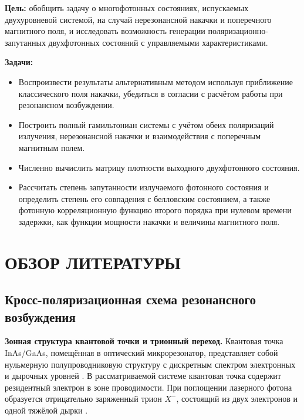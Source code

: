 \documentclass[11pt]{article}    %
\numberwithin{equation}{section}
\begin{document}
{\bf Цель:} обобщить задачу о многофотонных состояниях, испускаемых двухуровневой
системой, на случай нерезонансной накачки и поперечного магнитного поля,
и исследовать возможность генерации поляризационно-запутанных двухфотонных
состояний с управляемыми характеристиками.

{\bf Задачи:}
\begin{itemize}
    \item Воспроизвести результаты \cite{krainov2025} альтернативным методом
    используя приближение классического поля накачки, убедиться в согласии
    с расчётом работы \cite{krainov2025} при резонансном возбуждении.
    \item Построить полный гамильтониан системы с учётом обеих поляризаций
    излучения, нерезонансной накачки и взаимодействия
    с поперечным магнитным полем.
    \item Численно вычислить матрицу плотности выходного двухфотонного
    состояния.
    \item Рассчитать степень запутанности
    излучаемого фотонного состояния и определить степень его совпадения с белловским состоянием,
    а также фотонную корреляционную функцию второго порядка при нулевом времени задержки,
    как функции мощности накачки и величины магнитного поля.
\end{itemize}

\newpage

\section{ОБЗОР ЛИТЕРАТУРЫ}

\subsection{Кросс-поляризационная схема резонансного возбуждения}
\label{sec:cross-polarization}

\medskip
\textbf{Зонная структура квантовой точки и трионный переход.}
Квантовая точка InAs/GaAs, помещённая в оптический микрорезонатор,
представляет собой нульмерную полупроводниковую структуру с дискретным
спектром электронных и дырочных уровней \cite{bonch1965, anselm1963}.
В рассматриваемой системе квантовая точка содержит резидентный электрон в зоне проводимости.
При поглощении лазерного фотона образуется отрицательно заряженный трион
$X^-$, состоящий из двух электронов и одной тяжёлой дырки \cite{rakhlin2023}.
\end{document}
